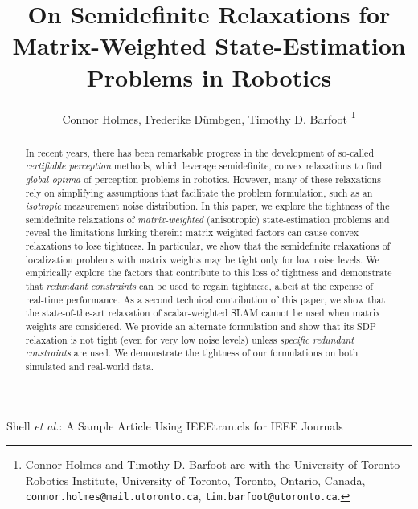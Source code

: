 \documentclass[lettersize,journal]{IEEEtran}
\begin{document}
\title{On Semidefinite Relaxations for Matrix-Weighted State-Estimation Problems in Robotics}

\author{Connor Holmes, Frederike D{\"u}mbgen, Timothy D. Barfoot\vspace*{-0.45in}
\thanks{Connor Holmes and Timothy D. Barfoot are with the University of Toronto Robotics Institute, University of Toronto, Toronto, Ontario, Canada, \texttt{connor.holmes@mail.utoronto.ca}, \texttt{tim.barfoot@utoronto.ca}.}}%

%
{Shell \MakeLowercase{\textit{et al.}}: A Sample Article Using IEEEtran.cls for IEEE Journals}




\maketitle

\begin{abstract}
In recent years, there has been remarkable progress in the development of so-called \emph{certifiable perception} methods, which leverage semidefinite, convex relaxations to find \emph{global optima} of perception problems in robotics. However, many of these relaxations rely on simplifying assumptions that facilitate the problem formulation, such as an \emph{isotropic} measurement noise distribution.
In this paper, we explore the tightness of the semidefinite relaxations of \emph{matrix-weighted} (anisotropic) state-estimation problems and reveal the limitations lurking therein: matrix-weighted factors can cause convex relaxations to lose tightness. In particular, we show that the semidefinite relaxations of localization problems with matrix weights may be tight only for low noise levels. We empirically explore the factors that contribute to this loss of tightness and demonstrate that \emph{redundant constraints} can be used to regain tightness, albeit at the expense of real-time performance.
As a second technical contribution of this paper, we show that the state-of-the-art relaxation of scalar-weighted SLAM cannot be used when matrix weights are considered. We provide an alternate formulation and show that its SDP relaxation is not tight (even for very low noise levels) unless \emph{specific redundant constraints} are used. 
We demonstrate the tightness of our formulations on both simulated and real-world data.

\end{abstract}
\end{document}
